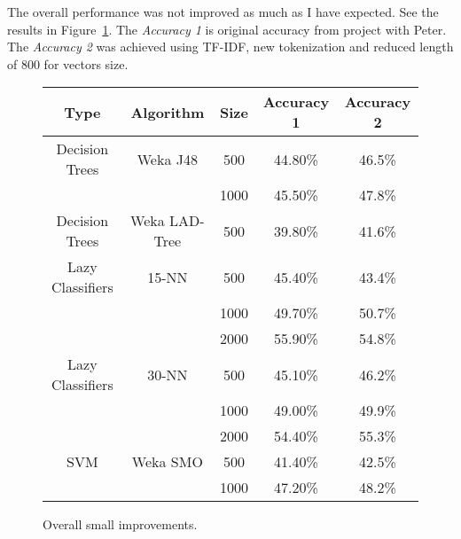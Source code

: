 The overall performance was not improved as much as I have expected. See the results in Figure~\ref{fig:performance}. 
The {\it Accuracy 1} is original accuracy from project with Peter. The {\it Accuracy 2} was achieved using TF-IDF, new tokenization and reduced length of 800 for vectors size.

\begin{figure}
\begin{center}
\begin{tabular}{|c|c|c|c|c|}
\hline
Type     &       Algorithm    & Size &   Accuracy 1 & Accuracy 2  \\ \hline
\hline
Decision Trees & Weka J48      &   500  &       44.80\%   &    46.5\% \\
                              &&  1000  &      45.50\%  &    47.8\%\\
Decision Trees & Weka LAD-Tree &   500  &      39.80\%  &    41.6\%\\

Lazy Classifiers & 15-NN &   500  &      45.40\% &    43.4\% \\
                              &&  1000  &      49.70\%  &    50.7\%\\
                              &&  2000  &      55.90\%  &    54.8\%\\
 
Lazy Classifiers & 30-NN  &   500  &      45.10\%  &    46.2\%\\
                              &&  1000  &      49.00\%  &    49.9\%\\
                              &&  2000  &      54.40\%  &    55.3\%\\


SVM & Weka SMO &   500  &      41.40\% &      42.5\% \\
                                     &&  1000  &      47.20\% &      48.2\% \\
\hline
\end{tabular}
\caption{\label{fig:performance} Overall small improvements. }
\end{center}
\end{figure}



